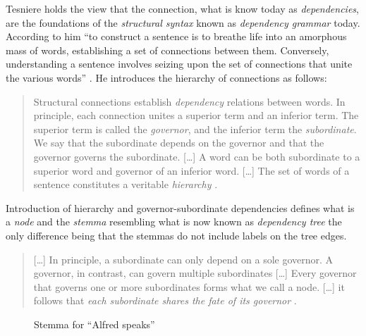     Tesniere holds the view that the connection, what is know today as \textit{dependencies}, are the foundations of the \textit{structural syntax} known as \textit{dependency grammar} today. According to him ``to construct a sentence is to breathe life into an amorphous mass of words, establishing a set of connections between them. Conversely, understanding a sentence involves seizing upon the set of connections that unite the various words'' \citep[4]{Tesniere2015}. He introduces the hierarchy of connections as follows: 
    
    \begin{quotation}
        Structural connections establish \textit{dependency} relations between words. In principle, each connection unites a superior term and an inferior term. The superior term is called the \textit{governor}, and the inferior term the \textit{subordinate}. We say that the subordinate depends on the governor and that the governor governs the subordinate. [\dots] A word can be both subordinate to a superior word and governor of an inferior word. [\dots] The set of words of a sentence constitutes a veritable \textit{hierarchy} \citep[5--6]{Tesniere2015}.
    \end{quotation}

    Introduction of hierarchy and governor-subordinate dependencies defines what is a \textit{node} and the \textit{stemma} resembling what is now known as \textit{dependency tree} the only difference being that the stemmas do not include labels on the tree edges. 

    \begin{quotation}
        [\dots] In principle, a subordinate can only depend on a sole governor. A governor, in contrast, can govern multiple subordinates [\dots] Every governor that governs one or more subordinates forms what we call a node. [\dots] it follows that \textit{each subordinate shares the fate of its governor} \citep[6]{Tesniere2015}.
    \end{quotation}

    \begin{figure}[!ht]
        \centering
        \caption{Stemma for ``Alfred speaks''}
        \label{fig:stemma1}
    \end{figure}
    
